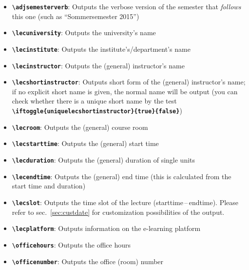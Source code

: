\documentclass[english]{article}
\newcommand*\jmacro[1]{\textbf{\texttt{#1}}}
\newcommand*\jcsmacro[1]{\jmacro{\textbackslash{#1}}}
\newcommand*\jparam[1]{\angus #1\angud}
\begin{document}
\begin{itemize}
\item \jcsmacro{adjsemesterverb}: Outputs the verbose version
of the semester that \emph{follows} this one (such as ``Sommer\-semester 2015'')
\item \jcsmacro{lecuniversity}: Outputs the university's name
\item \jcsmacro{lecinstitute}: Outputs the institute's/department's name
\item \jcsmacro{lecinstructor}: Outputs the (general) instructor's name
\item \jcsmacro{lecshortinstructor}: Outputs short form of the (general) instructor's name;
if no explicit short name is given, the normal name will be output (you can check whether
there is a unique short name by the test
\jcsmacro{iftoggle\{uniquelecshortinstructor\}\{\jparam{true}\}\{\jparam{false}\}})
\item \jcsmacro{lecroom}: Outputs the (general) course room
\item \jcsmacro{lecstarttime}: Outputs the (general) start time
\item \jcsmacro{lecduration}: Outputs the (general) duration of single units
\item \jcsmacro{lecendtime}: Outputs the (general) end time (this is calculated from the start time and duration)
\item \jcsmacro{lecslot}: Outputs the time slot of the lecture (starttime\,--\,endtime). Please refer to
      sec.~\ref{sec:custdate} for customization possibilities of the output.
\item \jcsmacro{lecplatform}: Outputs information on the
e-learning platform
\item \jcsmacro{officehours}: Outputs the office hours
\item \jcsmacro{officenumber}: Outputs the office (room) number
\end{itemize}
\end{document}
